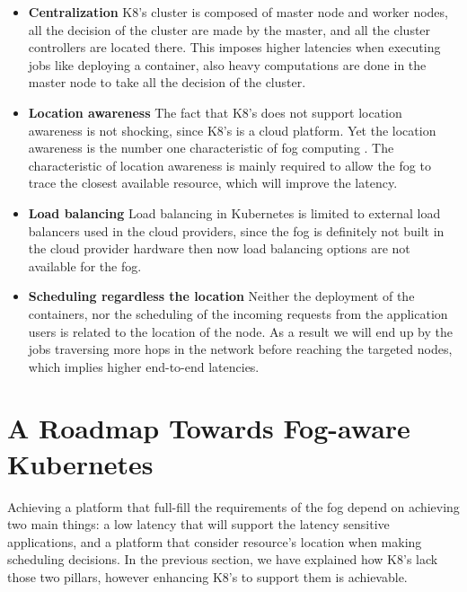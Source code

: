 \documentclass[letterpaper,twocolumn,10pt]{article}
\begin{document}
\begin{itemize}
\itemsep0em


\item {\bf Centralization}
K8's cluster is composed of master node and worker nodes, all the decision of the cluster are made by the master, and all the cluster controllers are located there. This imposes higher latencies when executing jobs like deploying a container, also heavy computations are done in the master node to take all the decision of the cluster.  

\item{\bf Location awareness}
The fact that K8's does not support location awareness is not shocking, since K8's is a cloud platform. Yet the location awareness is the number one characteristic of fog computing \cite{Bonomi:2012:FCR:2342509.2342513}. 
The characteristic of location awareness is mainly required to allow the fog to trace the closest available resource, which will improve the latency.

\item {\bf Load balancing}
Load balancing in Kubernetes is limited to external load balancers used in the cloud providers, since the fog is definitely not built in the cloud provider hardware then now load balancing options are not available for the fog.

\item {\bf Scheduling regardless the location}
Neither the deployment of the containers, nor the scheduling of the incoming requests from the application users  is related to the location of the node. As a result we will end up by the jobs traversing more hops in the network before reaching the targeted nodes, which implies higher end-to-end latencies.


\end{itemize}

\section{A Roadmap Towards Fog-aware Kubernetes}\label{road}

Achieving a platform that full-fill the requirements of the fog depend on achieving two main things: a low latency that will support the latency sensitive applications, and a platform that consider resource's location when making scheduling decisions. In the previous section, we have explained how K8's lack those two pillars, however enhancing K8's to support them is achievable.
\end{document}
